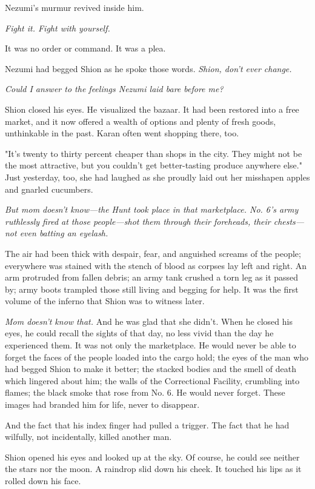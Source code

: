 Nezumi's murmur revived inside him.

\emph{Fight it. Fight with yourself.}

It was no order or command. It was a plea.

Nezumi had begged Shion as he spoke those words. \emph{Shion, don't ever
change.}

\emph{Could I answer to the feelings Nezumi laid bare before me?}

Shion closed his eyes. He visualized the bazaar. It had been restored
into a free market, and it now offered a wealth of options and plenty of
fresh goods, unthinkable in the past. Karan often went shopping there,
too.

"It's twenty to thirty percent cheaper than shops in the city. They
might not be the most attractive, but you couldn't get better-tasting
produce anywhere else." Just yesterday, too, she had laughed as she
proudly laid out her misshapen apples and gnarled cucumbers.

\emph{But mom doesn't know---the Hunt took place in that marketplace. No. 6's
army ruthlessly fired at those people---shot them through their foreheads,
their chests---not even batting an eyelash.}

The air had been thick with despair, fear, and anguished screams of the
people; everywhere was stained with the stench of blood as corpses lay
left and right. An arm protruded from fallen debris; an army tank
crushed a torn leg as it passed by; army boots trampled those still
living and begging for help. It was the first volume of the inferno that
Shion was to witness later.

\emph{Mom doesn't know that.} And he was glad that she didn't. When he closed
his eyes, he could recall the sights of that day, no less vivid than the
day he experienced them. It was not only the marketplace. He would never
be able to forget the faces of the people loaded into the cargo hold;
the eyes of the man who had begged Shion to make it better; the stacked
bodies and the smell of death which lingered about him; the walls of the
Correctional Facility, crumbling into flames; the black smoke that rose
from No. 6. He would never forget. These images had branded him for
life, never to disappear.

And the fact that his index finger had pulled a trigger. The fact that
he had wilfully, not incidentally, killed another man.

Shion opened his eyes and looked up at the sky. Of course, he could see
neither the stars nor the moon. A raindrop slid down his cheek. It
touched his lips as it rolled down his face.

